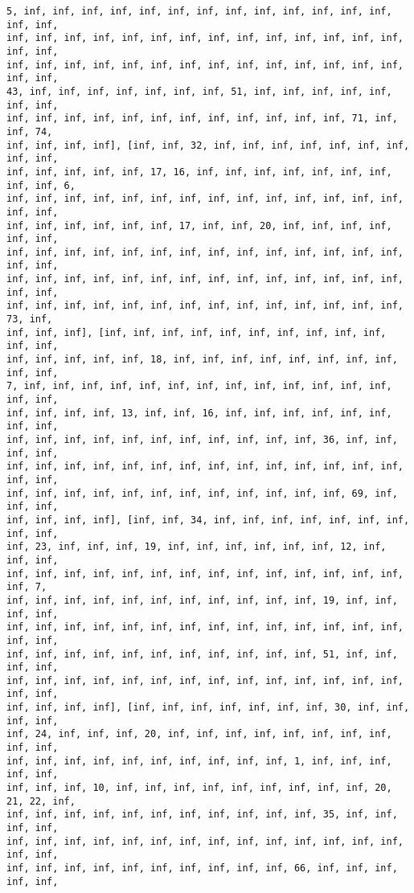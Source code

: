 \documentclass[11pt]{article}
\begin{document}
\begin{Verbatim}[commandchars=\\\{\}]
5, inf, inf, inf, inf, inf, inf, inf, inf, inf, inf, inf, inf, inf, inf, inf,
inf, inf, inf, inf, inf, inf, inf, inf, inf, inf, inf, inf, inf, inf, inf, inf,
inf, inf, inf, inf, inf, inf, inf, inf, inf, inf, inf, inf, inf, inf, inf, inf,
43, inf, inf, inf, inf, inf, inf, inf, 51, inf, inf, inf, inf, inf, inf, inf,
inf, inf, inf, inf, inf, inf, inf, inf, inf, inf, inf, inf, 71, inf, inf, 74,
inf, inf, inf, inf], [inf, inf, 32, inf, inf, inf, inf, inf, inf, inf, inf, inf,
inf, inf, inf, inf, inf, 17, 16, inf, inf, inf, inf, inf, inf, inf, inf, inf, 6,
inf, inf, inf, inf, inf, inf, inf, inf, inf, inf, inf, inf, inf, inf, inf, inf,
inf, inf, inf, inf, inf, inf, 17, inf, inf, 20, inf, inf, inf, inf, inf, inf,
inf, inf, inf, inf, inf, inf, inf, inf, inf, inf, inf, inf, inf, inf, inf, inf,
inf, inf, inf, inf, inf, inf, inf, inf, inf, inf, inf, inf, inf, inf, inf, inf,
inf, inf, inf, inf, inf, inf, inf, inf, inf, inf, inf, inf, inf, inf, 73, inf,
inf, inf, inf], [inf, inf, inf, inf, inf, inf, inf, inf, inf, inf, inf, inf,
inf, inf, inf, inf, inf, 18, inf, inf, inf, inf, inf, inf, inf, inf, inf, inf,
7, inf, inf, inf, inf, inf, inf, inf, inf, inf, inf, inf, inf, inf, inf, inf,
inf, inf, inf, inf, 13, inf, inf, 16, inf, inf, inf, inf, inf, inf, inf, inf,
inf, inf, inf, inf, inf, inf, inf, inf, inf, inf, inf, 36, inf, inf, inf, inf,
inf, inf, inf, inf, inf, inf, inf, inf, inf, inf, inf, inf, inf, inf, inf, inf,
inf, inf, inf, inf, inf, inf, inf, inf, inf, inf, inf, inf, 69, inf, inf, inf,
inf, inf, inf, inf], [inf, inf, 34, inf, inf, inf, inf, inf, inf, inf, inf, inf,
inf, 23, inf, inf, inf, 19, inf, inf, inf, inf, inf, inf, 12, inf, inf, inf,
inf, inf, inf, inf, inf, inf, inf, inf, inf, inf, inf, inf, inf, inf, inf, 7,
inf, inf, inf, inf, inf, inf, inf, inf, inf, inf, inf, 19, inf, inf, inf, inf,
inf, inf, inf, inf, inf, inf, inf, inf, inf, inf, inf, inf, inf, inf, inf, inf,
inf, inf, inf, inf, inf, inf, inf, inf, inf, inf, inf, 51, inf, inf, inf, inf,
inf, inf, inf, inf, inf, inf, inf, inf, inf, inf, inf, inf, inf, inf, inf, inf,
inf, inf, inf, inf], [inf, inf, inf, inf, inf, inf, inf, 30, inf, inf, inf, inf,
inf, 24, inf, inf, inf, 20, inf, inf, inf, inf, inf, inf, inf, inf, inf, inf,
inf, inf, inf, inf, inf, inf, inf, inf, inf, inf, 1, inf, inf, inf, inf, inf,
inf, inf, inf, 10, inf, inf, inf, inf, inf, inf, inf, inf, inf, 20, 21, 22, inf,
inf, inf, inf, inf, inf, inf, inf, inf, inf, inf, inf, 35, inf, inf, inf, inf,
inf, inf, inf, inf, inf, inf, inf, inf, inf, inf, inf, inf, inf, inf, inf, inf,
inf, inf, inf, inf, inf, inf, inf, inf, inf, inf, 66, inf, inf, inf, inf, inf,

\end{Verbatim}
\end{document}
